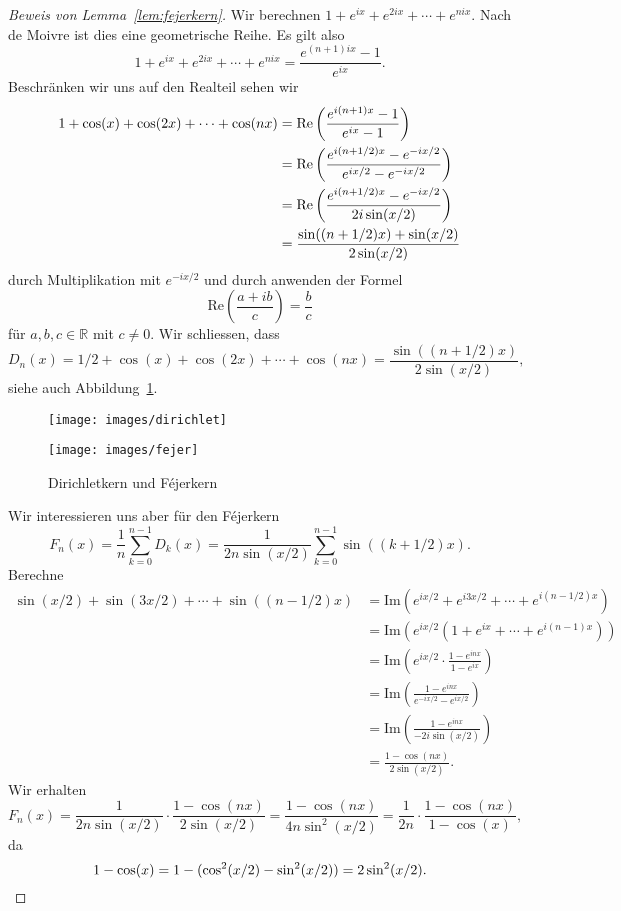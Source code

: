 \documentclass[../main.tex]{subfiles}
\begin{document}
\begin{proof}[Beweis von Lemma~\ref{lem:fejerkern}]
  Wir berechnen
  \(
    1 + e^{ix} + e^{2ix} + \cdots + e^{nix}.
  \)
  Nach de Moivre ist dies eine geometrische Reihe.
  Es gilt also
  \[
    1 + e^{ix} + e^{2ix} + \cdots + e^{nix} = \frac{e^{(n+1)ix} - 1}{e^{ix}}.
  \]
  Beschränken wir uns auf den Realteil sehen wir
  \begin{align*}
    1 + \cos(x) + \cos(2x) + \cdots + \cos(nx) 
    &=
    \textup{Re} \left( \frac{e^{i(n+1)x} - 1}{e^{ix} - 1} \right)\\
    &
    = \textup{Re} \left( \frac{e^{i(n + 1/2)x} - e^{-ix/2}}{e^{ix/2} - e^{-ix/2}} \right)\\
    &
    = \textup{Re} \left( \frac{e^{i(n + 1/2)x} - e^{-ix/2}}{2i \sin(x/2)} \right)\\
    &= \frac{\sin((n+1/2)x) + \sin(x/2)}{2 \sin(x/2)}
  \end{align*}
  durch Multiplikation mit $e^{-ix/2}$ und durch anwenden der Formel
  \[
    \text{Re}\left( \frac{a + ib}{c} \right) = \frac{b}{c}
  \]
  für $a, b, c \in \mathbb{R}$ mit $c \neq 0$.
  Wir schliessen, dass
  \[
    D_n(x) = 1/2 + \cos(x) + \cos(2x) + \cdots + \cos(nx)
    = \frac{\sin((n+ 1/2)x)}{2 \sin(x/2)},
  \]
  siehe auch Abbildung~\ref{fig:dirichlet}.

\begin{figure}[htb] 
  \centering
  \begin{minipage}{0.50\textwidth}
    \centering
    \texttt{[image: images/dirichlet]}
  \end{minipage}%
  \begin{minipage}{0.50\textwidth}
    \centering
    \texttt{[image: images/fejer]}
  \end{minipage}%
  \caption{Dirichletkern und Féjerkern}%
  \label{fig:dirichlet}
\end{figure}

  
  Wir interessieren uns aber für den Féjerkern
  \[
    F_n(x) = \frac{1}{n} \sum_{k=0}^{n-1} D_k(x)
    =\frac{1}{2n \sin(x/2)} \sum_{k=0}^{n-1} \sin((k + 1/2)x).
  \]
  Berechne
  \begin{align*}
     \sin(x/2) + \sin(3x/2) + \cdots + \sin((n-1/2)x)
     &= \text{Im}(e^{ix/2} + e^{i3x/2} + \cdots + e^{i(n-1/2)x})  \\
     &= \text{Im}(e^{ix/2}(1 + e^{ix} + \cdots + e^{i(n-1)x}))\\
     &= \text{Im} \left( e^{ix/2} \cdot \frac{1 - e^{inx}}{1 - e^{ix}} \right)\\
     &= \text{Im} \left( \frac{1 - e^{inx}}{e^{-ix/2} - e^{ix/2}} \right)\\
     &= \text{Im} \left( \frac{1 - e^{inx}}{-2i \sin(x/2)} \right)\\
     &= \frac{1- \cos(nx)}{2 \sin(x/2)}.
  \end{align*}
  Wir erhalten
  \[
    F_n(x) = \frac{1}{2n \sin(x/2)} \cdot \frac{1 - \cos(nx)}{2 \sin(x/2)}
    =\frac{1 - \cos(nx)}{4n \sin^2(x/2)}
    = \frac{1}{2n} \cdot \frac{1 - \cos(nx)}{1 - \cos(x)},
  \]
  da
  \[
    1 - \cos(x) = 1 - (\cos^2(x/2) - \sin^2(x/2))
    = 2 \sin^2(x/2). \qedhere
  \]
\end{proof}
\end{document}
